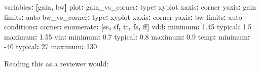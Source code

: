 \documentclass[
]{article}
\newenvironment{Shaded}{}{}
\newcommand{\AttributeTok}[1]{\textcolor[rgb]{0.49,0.56,0.16}{#1}}
\newcommand{\DecValTok}[1]{\textcolor[rgb]{0.25,0.63,0.44}{#1}}
\newcommand{\FloatTok}[1]{\textcolor[rgb]{0.25,0.63,0.44}{#1}}
\newcommand{\FunctionTok}[1]{\textcolor[rgb]{0.02,0.16,0.49}{#1}}
\newcommand{\KeywordTok}[1]{\textcolor[rgb]{0.00,0.44,0.13}{\textbf{#1}}}
\begin{document}
\begin{Shaded}
\begin{Highlighting}[]
\AttributeTok{        }\FunctionTok{variables}\KeywordTok{:}\AttributeTok{ }\KeywordTok{[}\AttributeTok{gain}\KeywordTok{,}\AttributeTok{ bw}\KeywordTok{]}
\AttributeTok{    }\FunctionTok{plot}\KeywordTok{:}
\AttributeTok{      }\FunctionTok{gain\_vs\_corner}\KeywordTok{:}
\AttributeTok{        }\FunctionTok{type}\KeywordTok{:}\AttributeTok{ xyplot}
\AttributeTok{        }\FunctionTok{xaxis}\KeywordTok{:}\AttributeTok{ corner}
\AttributeTok{        }\FunctionTok{yaxis}\KeywordTok{:}\AttributeTok{ gain}
\AttributeTok{        }\FunctionTok{limits}\KeywordTok{:}\AttributeTok{ auto}
\AttributeTok{      }\FunctionTok{bw\_vs\_corner}\KeywordTok{:}
\AttributeTok{        }\FunctionTok{type}\KeywordTok{:}\AttributeTok{ xyplot}
\AttributeTok{        }\FunctionTok{xaxis}\KeywordTok{:}\AttributeTok{ corner}
\AttributeTok{        }\FunctionTok{yaxis}\KeywordTok{:}\AttributeTok{ bw}
\AttributeTok{        }\FunctionTok{limits}\KeywordTok{:}\AttributeTok{ auto}
\AttributeTok{    }\FunctionTok{conditions}\KeywordTok{:}
\AttributeTok{      }\FunctionTok{corner}\KeywordTok{:}
\AttributeTok{        }\FunctionTok{enumerate}\KeywordTok{:}\AttributeTok{ }\KeywordTok{[}\AttributeTok{ss}\KeywordTok{,}\AttributeTok{ sf}\KeywordTok{,}\AttributeTok{ tt}\KeywordTok{,}\AttributeTok{ fs}\KeywordTok{,}\AttributeTok{ ff}\KeywordTok{]}
\AttributeTok{      }\FunctionTok{vdd}\KeywordTok{:}
\AttributeTok{        }\FunctionTok{minimum}\KeywordTok{:}\AttributeTok{ }\FloatTok{1.45}
\AttributeTok{        }\FunctionTok{typical}\KeywordTok{:}\AttributeTok{ }\FloatTok{1.5}
\AttributeTok{        }\FunctionTok{maximum}\KeywordTok{:}\AttributeTok{ }\FloatTok{1.55}
\AttributeTok{      }\FunctionTok{vin}\KeywordTok{:}
\AttributeTok{        }\FunctionTok{minimum}\KeywordTok{:}\AttributeTok{ }\FloatTok{0.7}
\AttributeTok{        }\FunctionTok{typical}\KeywordTok{:}\AttributeTok{ }\FloatTok{0.8}
\AttributeTok{        }\FunctionTok{maximum}\KeywordTok{:}\AttributeTok{ }\FloatTok{0.9}
\AttributeTok{      }\FunctionTok{temp}\KeywordTok{:}
\AttributeTok{        }\FunctionTok{minimum}\KeywordTok{:}\AttributeTok{ }\DecValTok{{-}40}
\AttributeTok{        }\FunctionTok{typical}\KeywordTok{:}\AttributeTok{ }\DecValTok{27}
\AttributeTok{        }\FunctionTok{maximum}\KeywordTok{:}\AttributeTok{ }\DecValTok{130}
\end{Highlighting}
\end{Shaded}

Reading this as a reviewer would:
\end{document}
